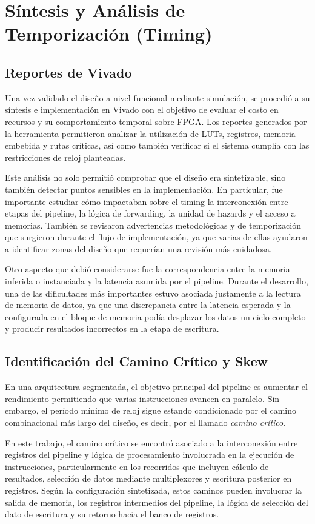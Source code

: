 \section{Síntesis y Análisis de Temporización (Timing)}

\subsection{Reportes de Vivado}
Una vez validado el diseño a nivel funcional mediante simulación, se procedió a su síntesis e implementación en Vivado con el objetivo de evaluar el costo en recursos y su comportamiento temporal sobre FPGA. Los reportes generados por la herramienta permitieron analizar la utilización de LUTs, registros, memoria embebida y rutas críticas, así como también verificar si el sistema cumplía con las restricciones de reloj planteadas.

Este análisis no solo permitió comprobar que el diseño era sintetizable, sino también detectar puntos sensibles en la implementación. En particular, fue importante estudiar cómo impactaban sobre el timing la interconexión entre etapas del pipeline, la lógica de forwarding, la unidad de hazards y el acceso a memorias. También se revisaron advertencias metodológicas y de temporización que surgieron durante el flujo de implementación, ya que varias de ellas ayudaron a identificar zonas del diseño que requerían una revisión más cuidadosa.

Otro aspecto que debió considerarse fue la correspondencia entre la memoria inferida o instanciada y la latencia asumida por el pipeline. Durante el desarrollo, una de las dificultades más importantes estuvo asociada justamente a la lectura de memoria de datos, ya que una discrepancia entre la latencia esperada y la configurada en el bloque de memoria podía desplazar los datos un ciclo completo y producir resultados incorrectos en la etapa de escritura.

\subsection{Identificación del Camino Crítico y Skew}
En una arquitectura segmentada, el objetivo principal del pipeline es aumentar el rendimiento permitiendo que varias instrucciones avancen en paralelo. Sin embargo, el período mínimo de reloj sigue estando condicionado por el camino combinacional más largo del diseño, es decir, por el llamado \textit{camino crítico}.

En este trabajo, el camino crítico se encontró asociado a la interconexión entre registros del pipeline y lógica de procesamiento involucrada en la ejecución de instrucciones, particularmente en los recorridos que incluyen cálculo de resultados, selección de datos mediante multiplexores y escritura posterior en registros. Según la configuración sintetizada, estos caminos pueden involucrar la salida de memoria, los registros intermedios del pipeline, la lógica de selección del dato de escritura y su retorno hacia el banco de registros.

